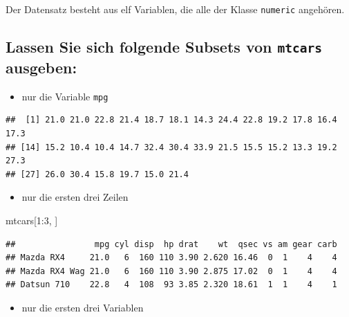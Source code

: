 \documentclass[12pt,a4paper]{article}
\newenvironment{Shaded}{\begin{snugshade}}{\end{snugshade}}
\newcommand{\DecValTok}[1]{\textcolor[rgb]{0.00,0.00,0.81}{#1}}
\newcommand{\NormalTok}[1]{#1}
\newcommand{\SpecialCharTok}[1]{\textcolor[rgb]{0.00,0.00,0.00}{#1}}
\begin{document}
Der Datensatz besteht aus elf Variablen, die alle der Klasse
\texttt{numeric} angehören.

\hypertarget{lassen-sie-sich-folgende-subsets-von-mtcars-ausgeben}{%
\subsection{\texorpdfstring{Lassen Sie sich folgende Subsets von
\texttt{mtcars}
ausgeben:}{Lassen Sie sich folgende Subsets von mtcars ausgeben:}}\label{lassen-sie-sich-folgende-subsets-von-mtcars-ausgeben}}

\begin{itemize}
  \item nur die Variable \texttt{mpg}
\end{itemize}

\begin{Shaded}
\end{Shaded}

\begin{verbatim}
##  [1] 21.0 21.0 22.8 21.4 18.7 18.1 14.3 24.4 22.8 19.2 17.8 16.4 17.3
## [14] 15.2 10.4 10.4 14.7 32.4 30.4 33.9 21.5 15.5 15.2 13.3 19.2 27.3
## [27] 26.0 30.4 15.8 19.7 15.0 21.4
\end{verbatim}

\begin{itemize}
  \item nur die ersten drei Zeilen
\end{itemize}

\begin{Shaded}
\begin{Highlighting}[]
\NormalTok{    mtcars[}\DecValTok{1}\SpecialCharTok{:}\DecValTok{3}\NormalTok{, ]}
\end{Highlighting}
\end{Shaded}

\begin{verbatim}
##                mpg cyl disp  hp drat    wt  qsec vs am gear carb
## Mazda RX4     21.0   6  160 110 3.90 2.620 16.46  0  1    4    4
## Mazda RX4 Wag 21.0   6  160 110 3.90 2.875 17.02  0  1    4    4
## Datsun 710    22.8   4  108  93 3.85 2.320 18.61  1  1    4    1
\end{verbatim}

\begin{itemize}
  \item nur die ersten drei Variablen
\end{itemize}
\end{document}
